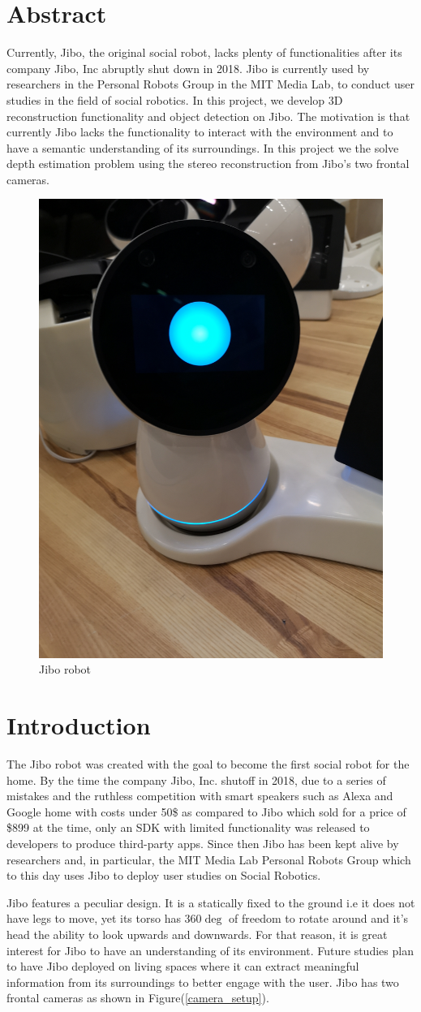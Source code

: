 \documentclass[12pt,letterpaper]{article}
\begin{document}
	
\section{Abstract}
Currently, Jibo, the original social robot, lacks plenty of functionalities after its company Jibo, Inc abruptly shut down in 2018. Jibo is currently used by researchers in the Personal Robots Group in the MIT Media Lab, to conduct user studies in the field of social robotics. In this project, we develop 3D reconstruction functionality and object detection on Jibo. The motivation is that currently Jibo lacks the functionality to interact with the environment and to have a semantic understanding of its surroundings. In this project we the solve depth estimation problem using the stereo reconstruction from Jibo's two frontal cameras.

\begin{figure}[h]
	\centering
	\includegraphics[width=0.3\linewidth]{./images/jibo.jpg}
	\caption{Jibo robot}
\end{figure}

\section{Introduction}
The Jibo robot was created with the goal to become the first social robot for the home. By the time the company Jibo, Inc. shutoff in 2018, due to a series of mistakes and the ruthless competition with smart speakers such as Alexa and Google home with costs under 50\$ as compared to Jibo which sold for a price of \$899 at the time, only an SDK with limited functionality was released to developers to produce third-party apps. Since then Jibo has been kept alive by researchers and, in particular, the MIT Media Lab Personal Robots Group which to this day uses Jibo to deploy user studies on Social Robotics.

Jibo features a peculiar design. It is a statically fixed to the ground i.e it does not have legs to move, yet its torso has 360$\deg$ of freedom to rotate around and it's head the ability to look upwards and downwards. For that reason, it is great interest for Jibo to have an understanding of its environment.  Future studies plan to have Jibo deployed on living spaces where it can extract meaningful information from its surroundings to better engage with the user. Jibo has two frontal cameras as shown in Figure(\ref{camera_setup}).
\end{document}

